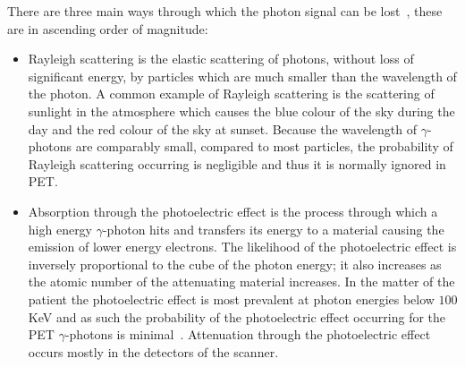                 There are three main ways through which the photon signal can be lost~, these are in ascending order of magnitude:
                
                \begin{itemize}
                    
                    \item Rayleigh scattering is the elastic scattering of photons, without loss of significant energy, by particles which are much smaller than the wavelength of the photon. A common example of Rayleigh scattering is the scattering of sunlight in the atmosphere which causes the blue colour of the sky during the day and the red colour of the sky at sunset. Because the wavelength of $\gamma$-photons are comparably small, compared to most particles, the probability of Rayleigh scattering occurring is negligible and thus it is normally ignored in \gls{PET}.
                    
                    \item Absorption through the photoelectric effect is the process through which a high energy $\gamma$-photon hits and transfers its energy to a material causing the emission of lower energy electrons. The likelihood of the photoelectric effect is inversely proportional to the cube of the photon energy; it also increases as the atomic number of the attenuating material increases. In the matter of the patient the photoelectric effect is most prevalent at photon energies below $100$ \gls{KeV} and as such the probability of the photoelectric effect occurring for the \gls{PET} $\gamma$-photons is minimal~. %
                    Attenuation through the photoelectric effect occurs mostly in the detectors of the scanner.
                    

\end{itemize}
